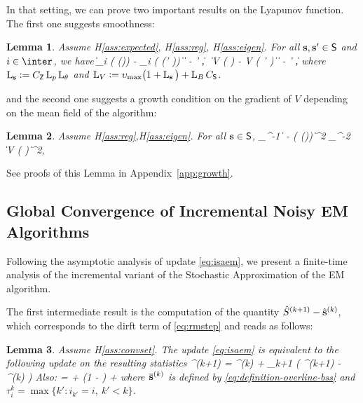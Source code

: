 \documentclass[11pt]{article}
\newtheorem{Lemma}{Lemma}
\theoremstyle{t}
\begin{document}
In that setting, we can prove two important results on the Lyapunov function. The first one suggests smoothness:
\begin{Lemma} \label{lem:smooth}
\citep{karimi2019global} Assume H\ref{ass:expected}, H\ref{ass:reg}, H\ref{ass:eigen}.  
For all $\bss,\bss' \in \Sset$ and $i \in \inter$, we have
\beq \label{eq:smooth}
\| \overline{\bss}_i ( \overline{\param} ({\bss})) - \overline{\bss}_i ( \overline{\param} ({\bss}' )) \| \leq \Lip{{\bss}} \| {\bss} - {\bss}' \|,~~\| \grd  V ( {\bss} ) - \grd  V ( {\bss}' ) \| \leq {} \| {\bss} - {\bss}' \|,
\eeq
where $\Lip{\bss} \eqdef C_{\Zset} \Lip{p} \Lip{\theta}$ and $\Lip{V}  \eqdef \upsilon_{\max} \big( 1 + \Lip{{\bss}} \big) + \Lip{B} C_{\Sset}$.
\end{Lemma}
and the second one suggests a growth condition on the gradient of $V$ depending on the mean field of the algorithm:
\begin{Lemma}\label{lem:growth}
Assume H\ref{ass:reg},H\ref{ass:eigen}. For all $\bss \in \Sset$,
\beq \label{eq:semigrad}
\upsilon_{\min}^{-1} 
\geq \big\| {\bss} - \os( \op ({\bss})) \big\|^2 \geq \upsilon_{\max}^{-2} \| \grd V ( {\bss} ) \|^2,
\eeq
\end{Lemma}
See proofs of this Lemma in Appendix~\ref{app:growth}.

\subsection{Global Convergence of Incremental Noisy EM Algorithms}
Following the asymptotic analysis of update \eqref{eq:isaem}, we present a finite-time analysis of the incremental variant of the Stochastic Approximation of the EM algorithm.

The first intermediate result is the computation of the quantity $\hat{S}^{(k+1)} - \hat{\bss}^{(k)}$, which corresponds to the dirft term of \eqref{eq:rmstep} and reads as follows:
\begin{Lemma} \label{lem:meanfield_isaem}
 Assume H\ref{ass:convset}. The update \eqref{eq:isaem} is equivalent to the following update on the resulting statistics 
\beq
\hat{\bss}^{(k+1)} =  \hat{\bss}^{(k)}  + \gamma_{k+1} \big( ^{(k+1)} - \hat{\bss}^{(k)} \big)
\eeq 
Also:
\beq
\EE{} = \EE{} + \left(1 -  \right) \EE\left[\frac{1}{n} \sum_{i=1}^n \tilde{S}_i^{(\tau_i^k)}- \hat{\bss}^{(k)}\right]  +\EE{}
\eeq
where $\overline{\bss}^{(k)}$ is defined by \eqref{eq:definition-overline-bss} and $\tau_i^k = \max \{ k' : i_{k'} = i,~k' < k \}$.
\end{Lemma}
\end{document}
